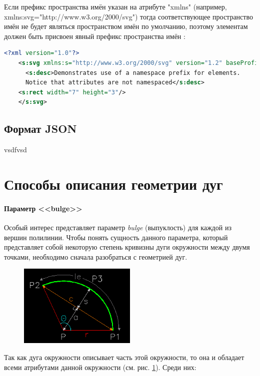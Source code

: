 Если префикс пространства имён указан на атрибуте "xmlns" (например, xmlns:svg="http://www.w3.org/2000/svg") тогда соответствующее пространство имён не будет являться пространством имён по умолчанию, поэтому элементам должен быть присвоен явный префикс пространства имён \cite{andersson2008scalable}:
\begin{lstlisting}[language=XML,label=list:xml]
	<?xml version="1.0"?>
	<s:svg xmlns:s="http://www.w3.org/2000/svg" version="1.2" baseProfile="tiny">
	  <s:desc>Demonstrates use of a namespace prefix for elements.
	  Notice that attributes are not namespaced</s:desc>
	<s:rect width="7" height="3"/>
	</s:svg>
\end{lstlisting}

\subsection{Формат JSON}
vsdfvsd

\section{Способы описания геометрии дуг}

\paragraph{Параметр <<bulge>>}\label{sec:bulge}

Особый интерес представляет параметр \textit{bulge} (выпуклость) для каждой из вершин полилинии.
Чтобы понять сущность данного параметра, который представляет собой некоторую степень кривизны дуги окружности между двумя точками, необходимо сначала разобраться с геометрией дуг.

\begin{figure}[H]
	\centering
	\includegraphics[width=0.5\textwidth]{figures/arcgeom.png}
	\label{fig:arcgeom}
\end{figure}

Так как дуга окружности описывает часть этой окружности, то она и обладает всеми атрибутами данной окружности (см. рис. \ref{fig:arcgeom}). Среди них:

